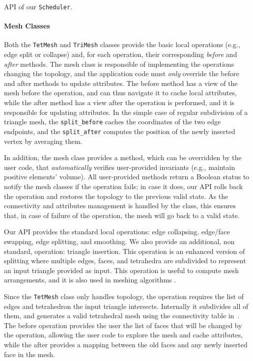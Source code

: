 \begin{algorithm}
\inputminted{cpp}{wmtk-tex/code/scheduler.cpp}
\caption{API of our \texttt{Scheduler}.}
\label{algo:scheduler}
\end{algorithm}

\paragraph{Mesh Classes}
Both the \texttt{TetMesh} and \texttt{TriMesh} classes provide the basic local operations (e.g., edge split or collapse) and, for each operation, their corresponding \emph{before} and \emph{after} methods. The mesh class is responsible of implementing the operations changing the topology, and the application code must \emph{only} override the before and after methods to update attributes. The before method has a view of the mesh before the operation, and can thus navigate it to cache local attributes, while the after method has a view after the operation is performed, and it is responsible for updating attributes. In the simple case of regular subdivision of a triangle mesh, the \texttt{split\_before} caches the coordinates of the two edge endpoints, and the \texttt{split\_after} computes the position of the newly inserted vertex by averaging them. 

In addition, the mesh class provides a method, which can be overridden by the user code, that \emph{automatically} verifies user-provided invariants (e.g., maintain positive elements' volume). All user-provided methods return a Boolean status to notify the mesh classes if the operation fails; in case it does, our API rolls back the operation and restores the topology to the previous valid state. As the connectivity and attributes management is handled by the class, this ensures that, in case of failure of the operation, the mesh will go back to a valid state.

Our API provides the standard local operations: edge collapsing. edge/face swapping, edge splitting, and smoothing. We also provide an additional, non standard, operation: triangle insertion. This operation is an enhanced version of splitting where multiple edges, faces, and tetrahedra are subdivided to represent an input  triangle provided as input. This operation is useful to compute mesh arrangements, and it is also used in meshing algorithms \cite{Hu:2019:fTetWild}.

Since the \texttt{TetMesh} class only handles topology, the operation requires the list of edges and tetrahedron the input triangle intersects. Internally it subdivides all of them, and generates a valid tetrahedral mesh using the connectivity table in~\cite{Hu:2019:fTetWild}. The before operation provides the user the list of  faces that will be changed by the operation, allowing the user code to explore the mesh and cache attributes,  while the after provides a mapping between the old faces and any newly inserted face in the mesh.


